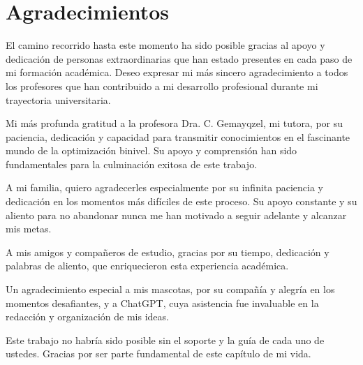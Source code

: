 
\chapter*{Agradecimientos}

El camino recorrido hasta este momento ha sido posible gracias al apoyo y dedicación de personas extraordinarias que han estado presentes en cada paso de mi formación académica. Deseo expresar mi más sincero agradecimiento a todos los profesores que han contribuido a mi desarrollo profesional durante mi trayectoria universitaria.

Mi más profunda gratitud a la profesora Dra. C. Gemayqzel, mi tutora, por su paciencia, dedicación y capacidad para transmitir conocimientos en el fascinante mundo de la optimización binivel. Su apoyo y comprensión han sido fundamentales para la culminación exitosa de este trabajo.

A mi familia, quiero agradecerles especialmente por su infinita paciencia y dedicación en los momentos más difíciles de este proceso. Su apoyo constante y su aliento para no abandonar nunca me han motivado a seguir adelante y alcanzar mis metas.

A mis amigos y compañeros de estudio, gracias por su tiempo, dedicación y palabras de aliento, que enriquecieron esta experiencia académica. 

Un agradecimiento especial a mis mascotas, por su compañía y alegría en los momentos desafiantes, y a ChatGPT, cuya asistencia fue invaluable en la redacción y organización de mis ideas.

Este trabajo no habría sido posible sin el soporte y la guía de cada uno de ustedes. Gracias por ser parte fundamental de este capítulo de mi vida.



